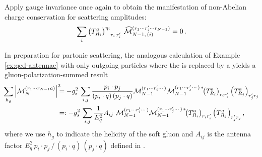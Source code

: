 
\begin{exercise}
    \label{ex:non-abelian-charge}
    Apply gauge invariance once again to obtain the manifestation of non-Abelian charge conservation for scattering amplitudes:
    \begin{align}
        \sum_{i}
        \le(T^a_{R_i}\ri)\indices{^{\eta_i}_{r_i\,r'_i}}
        \,
        \widehat{\mathcal{M}}
        ^{(r_1\cdots r'_i\cdots r_{N-1})}
        _{N-1,\,(i)}
        =
        0
        \,.
    \end{align}
\end{exercise}


\begin{example}
    \label{ex:qcd-antennae}
    In preparation for partonic scattering, the analogous calculation of Example \ref{ex:qed-antennae} with only outgoing particles where the  is replaced by a  yields a gluon-polarization-summed result
    \begin{align}
        \label{eq:qcd-antenna}
        \hspace{-2pt}
        \sum_{h_g}
        \abs{\mathcal{M}_N^{(r_1\cdots r_{N-1}a)}}^2
        \!\!\!
        &=
        -g_s^2
        \,
        \sum_{i, j}
        \frac{p_i \cdot p_j}
            {\le(p_i\cdot q\ri)\le(p_j \cdot q\ri)}
        \mathcal{M}_{N-1}^{(r_1\cdots r'_i \cdots )}
        \mathcal{M}_{N-1}^{(r_1\cdots r'_j \cdots )\,*}
        \!\!
        \le(T^a_{R_i}\ri)_{r_i r'_i}
        \le(T^a_{R_j}\ri)_{r'_j r_j}
        \!
        \\
        \notag
        &=:
        -g_s^2
        \,
        \sum_{i, j}
        \frac{1}{E_q^2}
        A_{ij}
        \,\,
        \mathcal{M}_{N-1}^{(r_1\cdots r'_i \cdots )}
        \mathcal{M}_{N-1}^{(r_1\cdots r'_j \cdots )\,*}
        \!\!
        \le(T^a_{R_i}\ri)_{r_i r'_i}
        \le(T^a_{R_j}\ri)_{r'_j r_j}
        ,
    \end{align}
    where we use \(h_g\) to indicate the helicity of the soft gluon and \(A_{ij}\) is the antenna factor \(E_q^2 \, p_i \cdot p_j \, / \, (p_i \cdot q)\,(p_j \cdot q)\) defined in .
\end{example}

